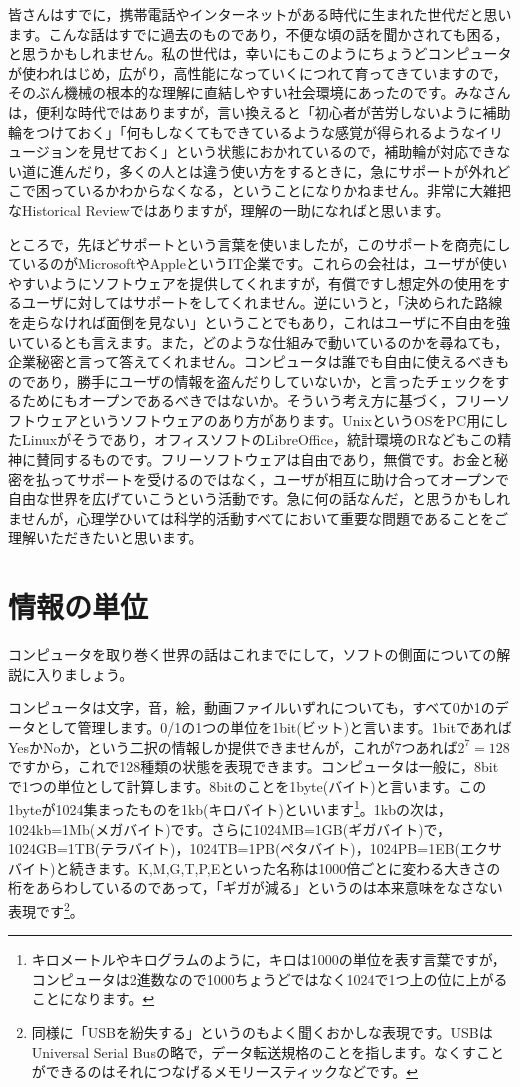 \documentclass{ltjsbook}
\begin{document}
皆さんはすでに，携帯電話やインターネットがある時代に生まれた世代だと思います。こんな話はすでに過去のものであり，不便な頃の話を聞かされても困る，と思うかもしれません。私の世代は，幸いにもこのようにちょうどコンピュータが使われはじめ，広がり，高性能になっていくにつれて育ってきていますので，そのぶん機械の根本的な理解に直結しやすい社会環境にあったのです。みなさんは，便利な時代ではありますが，言い換えると「初心者が苦労しないように補助輪をつけておく」「何もしなくてもできているような感覚が得られるようなイリュージョンを見せておく」という状態におかれているので，補助輪が対応できない道に進んだり，多くの人とは違う使い方をするときに，急にサポートが外れどこで困っているかわからなくなる，ということになりかねません。非常に大雑把なHistorical Reviewではありますが，理解の一助になればと思います。

ところで，先ほどサポートという言葉を使いましたが，このサポートを商売にしているのがMicrosoftやAppleというIT企業です。これらの会社は，ユーザが使いやすいようにソフトウェアを提供してくれますが，有償ですし想定外の使用をするユーザに対してはサポートをしてくれません。逆にいうと，「決められた路線を走らなければ面倒を見ない」ということでもあり，これはユーザに不自由を強いているとも言えます。また，どのような仕組みで動いているのかを尋ねても，企業秘密と言って答えてくれません。コンピュータは誰でも自由に使えるべきものであり，勝手にユーザの情報を盗んだりしていないか，と言ったチェックをするためにもオープンであるべきではないか。そういう考え方に基づく，フリーソフトウェアというソフトウェアのあり方があります。UnixというOSをPC用にしたLinuxがそうであり，オフィスソフトのLibreOffice，統計環境のRなどもこの精神に賛同するものです。フリーソフトウェアは自由であり，無償です。お金と秘密を払ってサポートを受けるのではなく，ユーザが相互に助け合ってオープンで自由な世界を広げていこうという活動です。急に何の話なんだ，と思うかもしれませんが，心理学ひいては科学的活動すべてにおいて重要な問題であることをご理解いただきたいと思います。

\section{情報の単位}
コンピュータを取り巻く世界の話はこれまでにして，ソフトの側面についての解説に入りましょう。

コンピュータは文字，音，絵，動画ファイルいずれについても，すべて0か1のデータとして管理します。0/1の1つの単位を1bit(ビット)と言います。1bitであればYesかNoか，という二択の情報しか提供できませんが，これが7つあれば$2^7=128$ですから，これで128種類の状態を表現できます。コンピュータは一般に，8bitで1つの単位として計算します。8bitのことを1byte(バイト)と言います。この1byteが1024集まったものを1kb(キロバイト)といいます\footnote{キロメートルやキログラムのように，キロは1000の単位を表す言葉ですが，コンピュータは2進数なので1000ちょうどではなく1024で1つ上の位に上がることになります。}。1kbの次は，1024kb=1Mb(メガバイト)です。さらに1024MB=1GB(ギガバイト)で，1024GB=1TB(テラバイト)，1024TB=1PB(ペタバイト)，1024PB=1EB(エクサバイト)と続きます。K,M,G,T,P,Eといった名称は1000倍ごとに変わる大きさの桁をあらわしているのであって，「ギガが減る」というのは本来意味をなさない表現です\footnote{同様に「USBを紛失する」というのもよく聞くおかしな表現です。USBはUniversal Serial Busの略で，データ転送規格のことを指します。なくすことができるのはそれにつなげるメモリースティックなどです。}。
\end{document}
